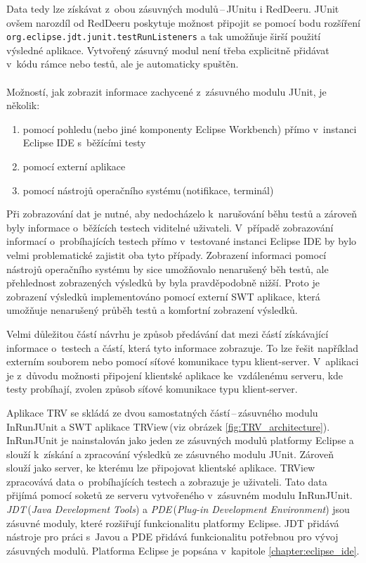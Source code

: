   Data tedy lze získávat z~obou zásuvných modulů\,--\,JUnitu i RedDeeru. JUnit ovšem narozdíl od RedDeeru poskytuje možnost připojit se pomocí bodu rozšíření\\\texttt{org.eclipse.jdt.junit.testRunListeners} a tak umožňuje širší použití výsledné aplikace. Vytvořený zásuvný modul není třeba explicitně přidávat v~kódu rámce nebo testů, ale je automaticky spuštěn.
  \\
  \\
  \noindent
  Možností, jak zobrazit informace zachycené z~zásuvného modulu JUnit, je několik:
  \begin{enumerate}
   \item pomocí pohledu\,(nebo jiné komponenty Eclipse Workbench) přímo v~instanci Eclipse IDE s~běžícími testy
   \item pomocí externí aplikace
   \item pomocí nástrojů operačního systému\,(notifikace, terminál)
  \end{enumerate}

  Při zobrazování dat je nutné, aby nedocházelo k~narušování běhu testů a zároveň byly informace o~běžících testech viditelné uživateli. V~případě zobrazování informací o~probíhajících testech přímo v~testované instanci Eclipse IDE by bylo velmi problematické zajistit oba tyto případy. Zobrazení informaci pomocí nástrojů operačního systému by sice umožňovalo nenarušený běh testů, ale přehlednost zobrazených výsledků by byla pravděpodobně nižší. Proto je zobrazení výsledků implementováno pomocí externí SWT aplikace, která umožňuje nenarušený průběh testů a komfortní zobrazení výsledků.

  Velmi důležitou částí návrhu je způsob předávání dat mezi částí získávající informace o~testech a částí, která tyto informace zobrazuje. To lze řešit například externím souborem nebo pomocí síťové komunikace typu klient-server. V~aplikaci je z~důvodu možnosti připojení klientské aplikace ke~vzdálenému serveru, kde testy probíhají, zvolen způsob síťové komunikace typu klient-server.

  Aplikace TRV se skládá ze dvou samostatných částí\,--\,zásuvného modulu InRunJUnit a SWT aplikace TRView\,(viz obrázek \ref{fig:TRV_architecture}). InRunJUnit je nainstalován jako jeden ze zásuvných modulů platformy Eclipse a slouží k~získání a zpracování výsledků ze zásuvného modulu JUnit. Zároveň slouží jako server, ke kterému lze připojovat klientské aplikace. TRView zpracovává data o~probíhajících testech a zobrazuje je uživateli. Tato data přijímá pomocí soketů ze serveru vytvořeného v~zásuvném modulu InRunJUnit. \emph{JDT}\,(\emph{Java Development Tools}) a \emph{PDE}\,(\emph{Plug-in Development Environment}) jsou zásuvné moduly, které rozšiřují funkcionalitu platformy Eclipse. JDT přidává nástroje pro práci s~Javou a PDE přidává funkcionalitu potřebnou pro vývoj zásuvných modulů. Platforma Eclipse je popsána v~kapitole \ref{chapter:eclipse_ide}.

